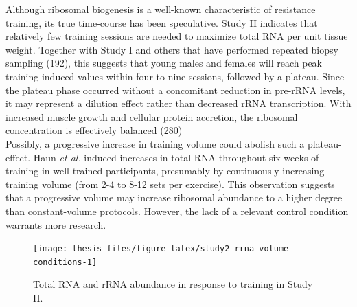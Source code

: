 \documentclass[twoside,10pt]{gihclass} %
\begin{document}
Although ribosomal biogenesis is a well-known characteristic of resistance training, its true time-course has been speculative.
Study II indicates that relatively few training sessions are needed to maximize total RNA per unit tissue weight.
Together with Study I and others that have performed repeated biopsy sampling (192), this suggests that young males and females will reach peak training-induced values within four to nine sessions, followed by a plateau.
Since the plateau phase occurred without a concomitant reduction in pre-rRNA levels, it may represent a dilution effect rather than decreased rRNA transcription. With increased muscle growth and cellular protein accretion, the ribosomal concentration is effectively balanced
(280)\\
Possibly, a progressive increase in training volume could abolish such a plateau-effect. Haun \emph{et al.} induced increases in total RNA throughout six weeks of training in well-trained participants, presumably by continuously increasing training volume (from 2-4 to 8-12 sets per exercise). This observation suggests that a progressive volume may increase ribosomal abundance to a higher degree than constant-volume protocols.
However, the lack of a relevant control condition warrants more research.
\begin{figure}

{\centering \texttt{[image: thesis\_files/figure-latex/study2-rrna-volume-conditions-1]} 

}

\caption[Total RNA (a) and rRNA (b) abundance in response to resistance training in variable- and constant-volume training conditions. Asterisk indicate robust difference between volume conditions.]{Total RNA and rRNA abundance in response to training in Study II.}\label{fig:study2-rrna-volume-conditions}
\end{figure}
\end{document}
